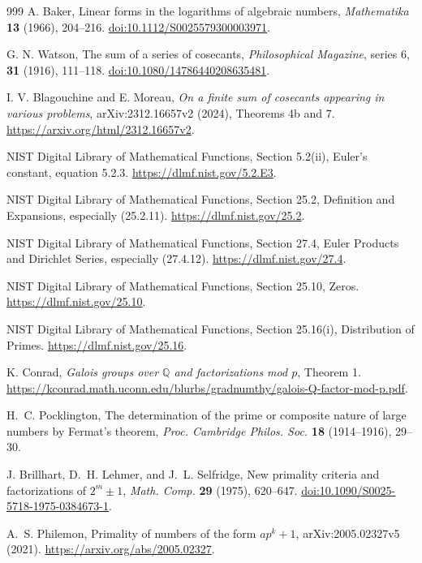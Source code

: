 \documentclass[11pt,a4paper]{article}
\theoremstyle{definition}
\theoremstyle{remark}
\numberwithin{equation}{section}
\begin{document}
\begin{thebibliography}{999}
A. Baker, Linear forms in the logarithms of algebraic numbers,
\emph{Mathematika} \textbf{13} (1966), 204--216.
\href{https://doi.org/10.1112/S0025579300003971}{doi:10.1112/S0025579300003971}.

G. N. Watson, The sum of a series of cosecants,
\emph{Philosophical Magazine}, series 6, \textbf{31} (1916), 111--118.
\href{https://doi.org/10.1080/14786440208635481}{doi:10.1080/14786440208635481}.

I. V. Blagouchine and E. Moreau, \emph{On a finite sum of cosecants
appearing in various problems}, arXiv:2312.16657v2 (2024),
Theorems 4b and 7.
\url{https://arxiv.org/html/2312.16657v2}.

NIST Digital Library of Mathematical Functions, Section 5.2(ii),
Euler's constant, equation 5.2.3.
\url{https://dlmf.nist.gov/5.2.E3}.

NIST Digital Library of Mathematical Functions,
Section 25.2, Definition and Expansions, especially (25.2.11).
\url{https://dlmf.nist.gov/25.2}.

NIST Digital Library of Mathematical Functions,
Section 27.4, Euler Products and Dirichlet Series, especially (27.4.12).
\url{https://dlmf.nist.gov/27.4}.

NIST Digital Library of Mathematical Functions,
Section 25.10, Zeros. \url{https://dlmf.nist.gov/25.10}.

NIST Digital Library of Mathematical Functions,
Section 25.16(i), Distribution of Primes.
\url{https://dlmf.nist.gov/25.16}.

K. Conrad, \emph{Galois groups over $\mathbb Q$ and factorizations mod $p$},
Theorem 1.
\url{https://kconrad.math.uconn.edu/blurbs/gradnumthy/galois-Q-factor-mod-p.pdf}.

H.~C. Pocklington,
The determination of the prime or composite nature of large numbers
by Fermat's theorem,
\emph{Proc. Cambridge Philos. Soc.} \textbf{18} (1914--1916), 29--30.

J. Brillhart, D.~H. Lehmer, and J.~L. Selfridge,
New primality criteria and factorizations of $2^m\pm1$,
\emph{Math. Comp.} \textbf{29} (1975), 620--647.
\href{https://doi.org/10.1090/S0025-5718-1975-0384673-1}
{doi:10.1090/S0025-5718-1975-0384673-1}.

A.~S. Philemon,
Primality of numbers of the form $ap^k+1$,
arXiv:2005.02327v5 (2021).
\url{https://arxiv.org/abs/2005.02327}.


\end{thebibliography}
\end{document}

